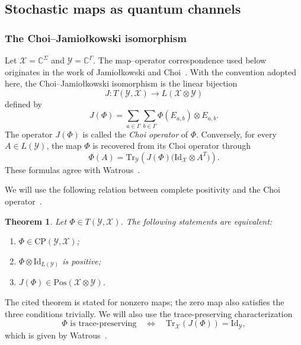 \documentclass[
    aps,
    pra,
    reprint,
    superscriptaddress,
    nofootinbib
]{revtex4-2}
\theoremstyle{definition}
\theoremstyle{plain}
\newtheorem{theorem}{Theorem}[section]
\begin{document}
\subsection{Stochastic maps as quantum channels}

\subsubsection{The Choi--Jamio{\l}kowski isomorphism}
\label{subsubsec:choi-isomorphism}
Let $\mathcal{X}=\mathbb{C}^{\Sigma}$ and
$\mathcal{Y}=\mathbb{C}^{\Gamma}$. The map--operator correspondence used
below originates in the work of Jamio{\l}kowski and
Choi~\cite{Jamiolkowski1972,Choi1975}. With the convention adopted here,
the Choi--Jamio{\l}kowski isomorphism is the linear bijection
\begin{equation}
    J:
    T(\mathcal{Y},\mathcal{X})
    \to
    L(\mathcal{X}\otimes\mathcal{Y})
\end{equation}
defined by
\begin{equation}
    J(\Phi)
    =
    \sum_{a\in\Gamma}\sum_{b\in\Gamma}
    \Phi(E_{a,b})\otimes E_{a,b}.
\end{equation}
The operator $J(\Phi)$ is called the \emph{Choi operator} of $\Phi$.
Conversely, for every $A\in L(\mathcal{Y})$, the map $\Phi$ is recovered
from its Choi operator through
\begin{equation}
    \Phi(A)
    =
    \mathrm{Tr}_{\mathcal{Y}}
    \left(
        J(\Phi)
        \bigl(
            \mathrm{Id}_{\mathcal{X}}\otimes A^{T}
        \bigr)
    \right).
\end{equation}
These formulas agree with
Watrous~\cite[Eqs.~(2.65)--(2.66)]{Watrous2018}.

We will use the following relation between complete positivity and the Choi
operator~\cite[Thm.~2.22]{Watrous2018}.
\begin{theorem}
    Let $\Phi\in T(\mathcal{Y},\mathcal{X})$. The following statements are
    equivalent:
    \begin{enumerate}
        \item $\Phi\in\mathrm{CP}(\mathcal{Y},\mathcal{X})$;
        \item $\Phi\otimes\mathrm{Id}_{L(\mathcal{Y})}$ is positive;
        \item $J(\Phi)\in\mathrm{Pos}(\mathcal{X}\otimes\mathcal{Y})$.
    \end{enumerate}
\end{theorem}
The cited theorem is stated for nonzero maps; the zero map also satisfies
the three conditions trivially. We will also use the trace-preserving
characterization
\begin{equation}
    \Phi\text{ is trace-preserving}
    \quad\Longleftrightarrow\quad
    \mathrm{Tr}_{\mathcal{X}}(J(\Phi))
    =
    \mathrm{Id}_{\mathcal{Y}},
\end{equation}
which is given by Watrous~\cite[Thm.~2.26]{Watrous2018}.
\end{document}
